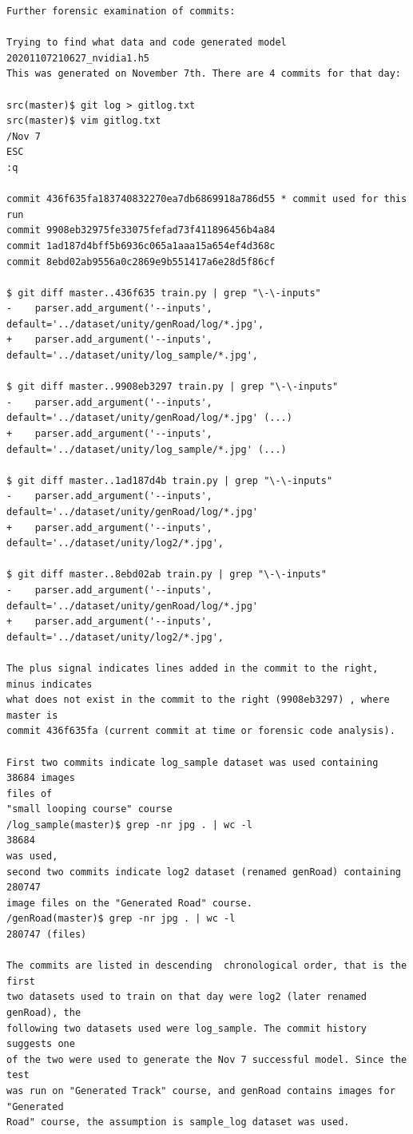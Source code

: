 \begin{verbatim}
Further forensic examination of commits:

Trying to find what data and code generated model 20201107210627_nvidia1.h5
This was generated on November 7th. There are 4 commits for that day:

src(master)$ git log > gitlog.txt
src(master)$ vim gitlog.txt 
/Nov 7
ESC
:q

commit 436f635fa183740832270ea7db6869918a786d55 * commit used for this run
commit 9908eb32975fe33075fefad73f411896456b4a84 
commit 1ad187d4bff5b6936c065a1aaa15a654ef4d368c
commit 8ebd02ab9556a0c2869e9b551417a6e28d5f86cf

$ git diff master..436f635 train.py | grep "\-\-inputs"
-    parser.add_argument('--inputs', default='../dataset/unity/genRoad/log/*.jpg',
+    parser.add_argument('--inputs', default='../dataset/unity/log_sample/*.jpg', 

$ git diff master..9908eb3297 train.py | grep "\-\-inputs"
-    parser.add_argument('--inputs', default='../dataset/unity/genRoad/log/*.jpg' (...)
+    parser.add_argument('--inputs', default='../dataset/unity/log_sample/*.jpg' (...)

$ git diff master..1ad187d4b train.py | grep "\-\-inputs"
-    parser.add_argument('--inputs', default='../dataset/unity/genRoad/log/*.jpg'
+    parser.add_argument('--inputs', default='../dataset/unity/log2/*.jpg', 

$ git diff master..8ebd02ab train.py | grep "\-\-inputs"
-    parser.add_argument('--inputs', default='../dataset/unity/genRoad/log/*.jpg'
+    parser.add_argument('--inputs', default='../dataset/unity/log2/*.jpg',

The plus signal indicates lines added in the commit to the right, minus indicates
what does not exist in the commit to the right (9908eb3297) , where master is 
commit 436f635fa (current commit at time or forensic code analysis).

First two commits indicate log_sample dataset was used containing 38684 images 
files of
"small looping course" course
/log_sample(master)$ grep -nr jpg . | wc -l
38684
was used, 
second two commits indicate log2 dataset (renamed genRoad) containing 280747 
image files on the "Generated Road" course.
/genRoad(master)$ grep -nr jpg . | wc -l
280747 (files)

The commits are listed in descending  chronological order, that is the first 
two datasets used to train on that day were log2 (later renamed genRoad), the
following two datasets used were log_sample. The commit history suggests one
of the two were used to generate the Nov 7 successful model. Since the test 
was run on "Generated Track" course, and genRoad contains images for "Generated
Road" course, the assumption is sample_log dataset was used.


\end{verbatim}

